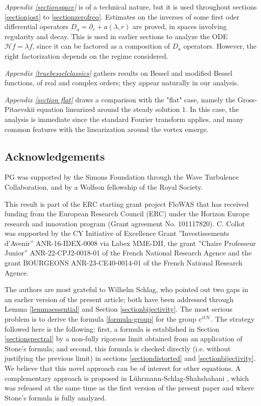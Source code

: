 \documentclass[11 pt]{amsart}
\theoremstyle{definition}
\theoremstyle{remark}
\numberwithin{equation}{section}
\begin{document}
\smallskip

\textit{Appendix \ref{sectionspace}} is of a technical nature, but it is used throughout sections \ref{sectionjost} to \ref{sectionzerofreq}. Estimates on the inverses of some first oder differential operators $D_a = \partial_r + a(\lambda ,r)$ are proved, in spaces involving regularity and decay. This is used in earlier sections to analyze the ODE $\mathcal{H} f = \lambda f$, since it can be factored as a composition of $D_a$ operators. However, the right factorization depends on the regime considered.

\smallskip

\textit{Appendix \ref{truebesselclassics}} gathers results on Bessel and modified Bessel functions, of real and complex orders; they appear naturally in our analysis.

\smallskip


\textit{Appendix \ref{section flat}} draws a comparison with the "flat" case, namely the Gross-Pitaevskii equation linearized around the steady solution $1$. In this case, the analysis is immediate since the standard Fourier transform applies, and many common features with the linearization around the vortex emerge. 

\subsection*{Acknowledgements} PG was supported by the Simons Foundation through the Wave Turbulence Collaboration, and by a Wolfson fellowship of the Royal Society.

This result is part of the ERC starting grant project FloWAS that has received funding from the European Research Council (ERC) under the Horizon Europe research and innovation program (Grant agreement No. 101117820). C. Collot was supported by the CY Initiative of Excellence Grant ”Investissements d’Avenir” ANR-16-IDEX-0008 via Labex MME-DII, the grant ”Chaire Professeur Junior” ANR-22-CPJ2-0018-01 of the French National Research Agence and the grant BOURGEONS ANR-23-CE40-0014-01 of the French National Research Agence.

\medskip

The authors are most grateful to Wilhelm Schlag, who pointed out two gaps in an earlier version of the present article; both have been addressed through Lemma \ref{lemmaessential} and Section \ref{sectionbijectivity}. The most serious problem is to derive the formula \eqref{formula-group} for the group $e^{it \mathcal{H}}$. The strategy followed here is the following: first, a formula is established in Section \ref{sectionspectral} by a non-fully rigorous limit obtained from an application of Stone's formula; and second, this formula is checked directly (i.e. without justifying the previous limit) in sections \ref{sectiondistorted} and \ref{sectionbijectivity}. We believe that this novel approach can be of interest for other equations. A complementary approach is proposed in L\"uhrmann-Schlag-Shahshahani \cite{LSS}, which was released at the same time as the first version of the present paper and where Stone's formula is fully analyzed.
\end{document}
